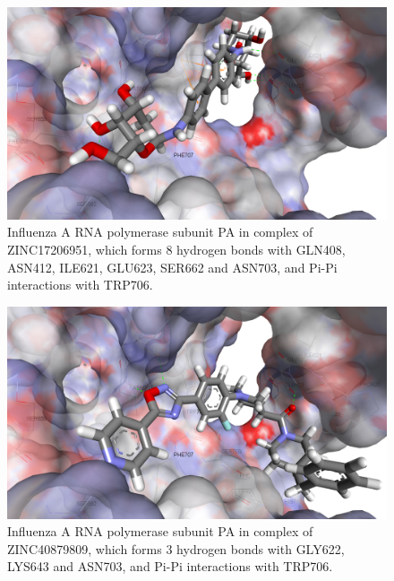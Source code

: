 \begin{figure}
\centering
\includegraphics[width=\linewidth]{Case/2ZNL-ZINC17206951.png}
\caption{Influenza A RNA polymerase subunit PA in complex of ZINC17206951, which forms 8 hydrogen bonds with GLN408, ASN412, ILE621, GLU623, SER662 and ASN703, and Pi-Pi interactions with TRP706.}
\label{Case:2ZNL-ZINC17206951}
\end{figure}

\begin{figure}
\centering
\includegraphics[width=\linewidth]{Case/2ZNL-ZINC40879809.png}
\caption{Influenza A RNA polymerase subunit PA in complex of ZINC40879809, which forms 3 hydrogen bonds with GLY622, LYS643 and ASN703, and Pi-Pi interactions with TRP706.}
\label{Case:2ZNL-ZINC40879809}
\end{figure}

